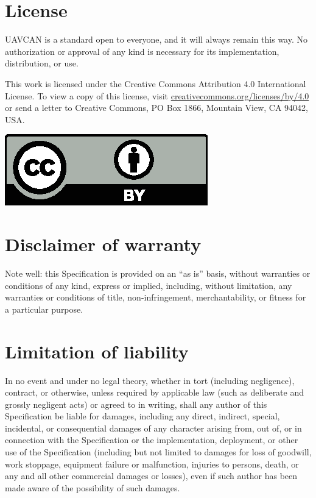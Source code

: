 \documentclass{uavcandoc}
\begin{document}
\begin{titlepage}
\section*{License}

UAVCAN is a standard open to everyone, and it will always remain this way.
No authorization or approval of any kind is necessary for its implementation, distribution, or use.

This work is licensed under the Creative Commons Attribution 4.0 International License.
To view a copy of this license, visit
\href{http://creativecommons.org/licenses/by/4.0/}{creativecommons.org/licenses/by/4.0}
or send a letter to Creative Commons, PO Box 1866, Mountain View, CA 94042, USA.

\hspace*{\fill}\includegraphics[height=1.75\baselineskip]{cc-by}\hspace*{\fill}

\section*{Disclaimer of warranty}

Note well: this Specification is provided on an ``as is'' basis, without warranties or conditions of any kind,
express or implied, including, without limitation, any warranties or conditions of
title, non-infringement, merchantability, or fitness for a particular purpose.

\section*{Limitation of liability}

In no event and under no legal theory, whether in tort (including negligence), contract, or otherwise,
unless required by applicable law (such as deliberate and grossly negligent acts) or agreed to in writing,
shall any author of this Specification be liable for damages,
including any direct, indirect, special, incidental, or consequential damages of any character arising
from, out of, or in connection with the Specification or the implementation, deployment,
or other use of the Specification (including but not limited to damages for loss of goodwill,
work stoppage, equipment failure or malfunction, injuries to persons, death,
or any and all other commercial damages or losses),
even if such author has been made aware of the possibility of such damages.

\end{titlepage}

\tableofcontents
\clearpage\onecolumn\listoftables
\clearpage\onecolumn\listoffigures

\mainmatter







\end{document}

